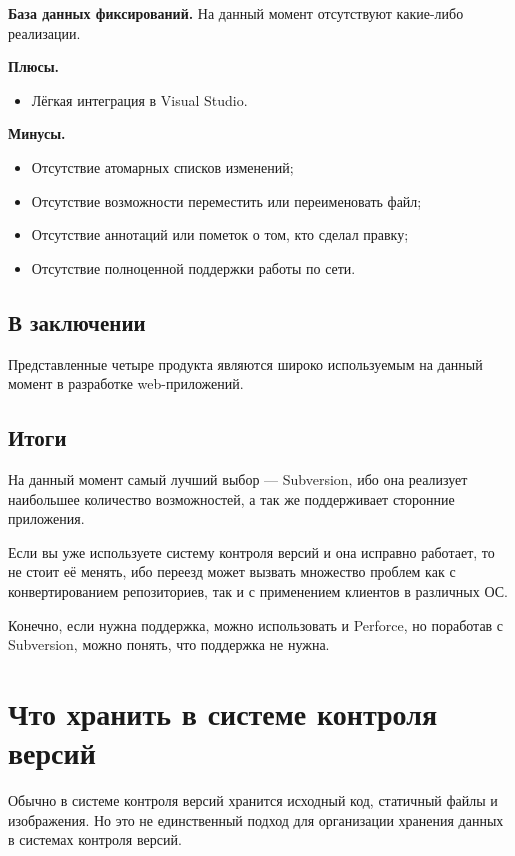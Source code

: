 \textbf{База данных фиксирований.} На данный момент отсутствуют какие-либо реализации.

\textbf{Плюсы.}
\begin{itemize}
\item Лёгкая интеграция в Visual Studio.
\end{itemize}



\textbf{Минусы.}
\begin{itemize}
\item Отсутствие атомарных списков изменений;
\item Отсутствие возможности переместить или переименовать файл;
\item Отсутствие аннотаций или пометок о том, кто сделал правку;
\item Отсутствие полноценной поддержки работы по сети.
\end{itemize}

\subsection{ В заключении } \label{sect3_4_6}

Представленные четыре продукта являются широко используемым на данный момент в разработке web-приложений.

\subsection{ Итоги } \label{sect3_4_7}

На данный момент самый лучший выбор --- Subversion, ибо она реализует наибольшее количество возможностей, а так же поддерживает сторонние приложения.

Если вы уже используете систему контроля версий и она исправно работает, то не стоит её менять, ибо переезд может вызвать множество проблем как с конвертированием репозиториев, так и с применением клиентов в различных ОС.

Конечно, если нужна поддержка, можно использовать и Perforce, но поработав с Subversion, можно понять, что поддержка не нужна.


\section{ Что хранить в системе контроля версий } \label{sect3_5}

Обычно в системе контроля версий хранится исходный код, статичный файлы и изображения. Но это не единственный подход для организации хранения данных в системах контроля версий.

